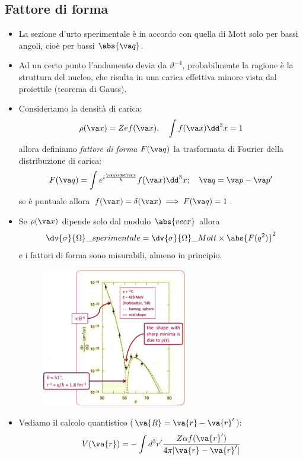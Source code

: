 \subsection{Fattore di forma}
\begin{itemize}
    \item La sezione d'urto sperimentale è in accordo con quella di Mott solo per bassi angoli, cioè per bassi $\abs{\va q}$. 
    \item Ad un certo punto l'andamento devia da $\vartheta^{-4}$, probabilmente la ragione è la struttura del nucleo, che risulta in una carica effettiva minore vista dal proiettile (teorema di Gauss).
    \item Consideriamo la densità di carica:
    \begin{equation*}
    \rho(\va x)=Zef(\va x),\quad \int f(\va x)\dd^3x=1
    \end{equation*}
    allora definiamo \textit{fattore di forma} $F(\va q)$ la trasformata di Fourier della distribuzione di carica:
    \begin{equation*}
        F(\va q)=\int e^{i\frac{\va q\vdot\va x}\hbar}f(\va x)\dd^3{x};\quad \va q=\va p-\va p'
    \end{equation*}
    se è puntuale allora $f(\va x)=\delta(\va x)\implies F(\va q)=1$.
    \item Se $\rho(\va x)$ dipende solo dal modulo $\abs{vec x}$ allora
    \begin{equation*}
        \dv{\sigma}{\Omega}\_{sperimentale}=\dv{\sigma}{\Omega}\_{Mott}\times\abs{F(q^2)}^2
    \end{equation*}
    e i fattori di forma sono misurabili, almeno in principio.
    \begin{figure}[H]
        \centering
        \includegraphics[width=0.6\textwidth]{immagini/fig_sigma_theta_en.png}
    \end{figure}
    \item Vediamo il calcolo quantistico ($\va{R} = \va{r} - \va{r}'$):
    \[
    V(\va{r}) = -\int d^3r' \frac{Z \alpha f(\va{r}')}{4 \pi |\va{r} - \va{r}'|}
    \]


\end{itemize}
